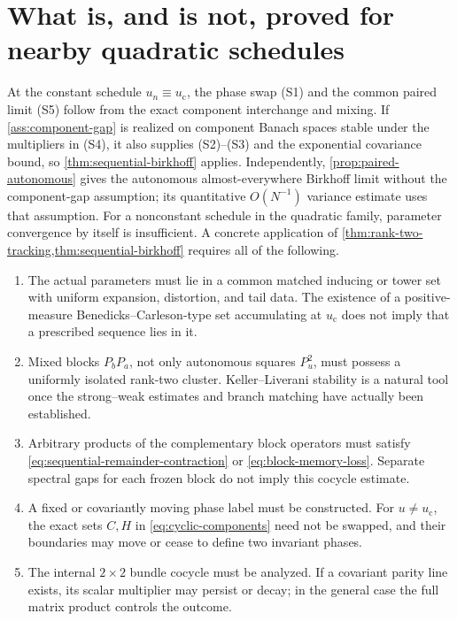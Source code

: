 \documentclass[11pt]{article}
\theoremstyle{definition}
\theoremstyle{remark}
\newcommand{\uc}{u_{\mathrm c}}
\begin{document}
\section{What is, and is not, proved for nearby quadratic schedules}

At the constant schedule $u_n\equiv\uc$, the phase swap (S1) and the common paired limit (S5) follow from the exact component interchange and mixing.  If \cref{ass:component-gap} is realized on component Banach spaces stable under the multipliers in (S4), it also supplies (S2)--(S3) and the exponential covariance bound, so \cref{thm:sequential-birkhoff} applies.  Independently, \cref{prop:paired-autonomous} gives the autonomous almost-everywhere Birkhoff limit without the component-gap assumption; its quantitative $O(N^{-1})$ variance estimate uses that assumption.  For a nonconstant schedule in the quadratic family, parameter convergence by itself is insufficient.  A concrete application of \cref{thm:rank-two-tracking,thm:sequential-birkhoff} requires all of the following.

\begin{enumerate}[label=(\arabic*)]
    \item The actual parameters must lie in a common matched inducing or tower set with uniform expansion, distortion, and tail data.  The existence of a positive-measure Benedicks--Carleson-type set accumulating at $\uc$ does not imply that a prescribed sequence lies in it.

    \item Mixed blocks $P_bP_a$, not only autonomous squares $P_u^2$, must possess a uniformly isolated rank-two cluster.  Keller--Liverani stability \citep{KellerLiverani1999} is a natural tool once the strong--weak estimates and branch matching have actually been established.

    \item Arbitrary products of the complementary block operators must satisfy \eqref{eq:sequential-remainder-contraction} or \eqref{eq:block-memory-loss}.  Separate spectral gaps for each frozen block do not imply this cocycle estimate.

    \item A fixed or covariantly moving phase label must be constructed.  For $u\ne\uc$, the exact sets $C,H$ in \eqref{eq:cyclic-components} need not be swapped, and their boundaries may move or cease to define two invariant phases.

    \item The internal $2\times2$ bundle cocycle must be analyzed.  If a covariant parity line exists, its scalar multiplier may persist or decay; in the general case the full matrix product controls the outcome.
\end{enumerate}
\end{document}
